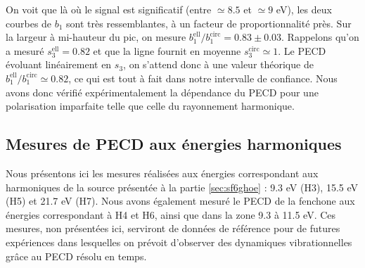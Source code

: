 On voit que là où le signal est significatif (entre $\simeq8.5$ et $\simeq 9$ eV), les deux courbes de $b_1$ sont très ressemblantes, à un facteur de proportionnalité près. Sur la largeur à mi-hauteur du pic, on mesure $b_1^{\text{ell}}/b_1^{\text{circ}} = 0.83 \pm 0.03$. Rappelons qu'on a mesuré $s_3^{\text{ell}} = 0.82$ et que la ligne fournit en moyenne $s_3^{\text{circ}} \simeq 1$. Le PECD évoluant linéairement en $s_3$, on s'attend donc à une valeur théorique de $b_1^{\text{ell}}/b_1^{\text{circ}} \simeq 0.82$, ce qui est tout à fait dans notre intervalle de confiance. Nous avons donc vérifié expérimentalement la dépendance du PECD pour une polarisation imparfaite telle que celle du rayonnement harmonique.

\subsection{Mesures de PECD aux énergies harmoniques}
Nous présentons ici les mesures réalisées aux énergies correspondant aux harmoniques de la source présentée à la partie \ref{sec:sf6ghoe} : 9.3 eV (H3), 15.5 eV (H5) et 21.7 eV (H7). Nous avons également mesuré le PECD de la fenchone aux énergies correspondant à H4 et H6, ainsi que dans la zone 9.3 à 11.5 eV. Ces mesures, non présentées ici, serviront de données de référence pour de futures expériences dans lesquelles on prévoit d'observer des dynamiques vibrationnelles grâce au PECD résolu en temps.

